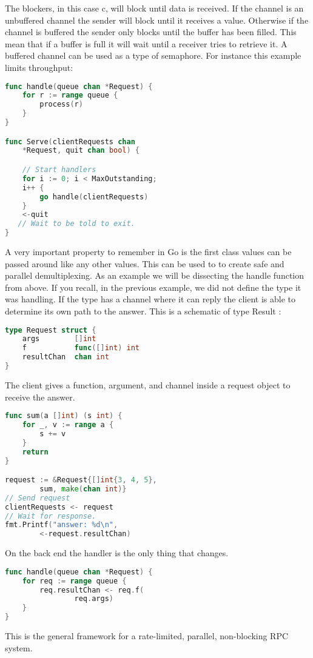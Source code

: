 The blockers, in this case c, will block until data is received. If the channel is an unbuffered channel the sender will block until it receives a value. Otherwise if the channel is buffered the sender only blocks until the buffer has been filled. This mean that if a buffer is full it will wait until a receiver tries to retrieve it. 
	A buffered channel can be used as a type of semaphore. For instance this example limits throughput:
\begin{lstlisting}[language=Go]
func handle(queue chan *Request) {
    for r := range queue {
        process(r)
    }
}

func Serve(clientRequests chan 
	*Request, quit chan bool) {

    // Start handlers
    for i := 0; i < MaxOutstanding;
    i++ {
        go handle(clientRequests)
    }
    <-quit 
   // Wait to be told to exit.
} 
\end{lstlisting}

A very important property to remember in Go is the first class values can be passed around like any other values. This can be used to to create safe and parallel demultiplexing. As an example we will be dissecting the handle function from above. If you recall, in the previous example, we did not define the type it was handling. If the type has a channel where it can reply the client is able to determine its own path to the answer. This is a schematic of type Result :
\begin{lstlisting}[language=Go]
type Request struct {
    args        []int
    f           func([]int) int
    resultChan  chan int
} 
\end{lstlisting}
The client gives a function, argument, and channel inside a request object to receive the answer.
\begin{lstlisting}[language=Go]
func sum(a []int) (s int) {
    for _, v := range a {
        s += v
    }
    return
}

request := &Request{[]int{3, 4, 5}, 
	 	sum, make(chan int)}
// Send request
clientRequests <- request
// Wait for response.
fmt.Printf("answer: %d\n",
		<-request.resultChan)
\end{lstlisting}
On the back end the handler is the only thing that changes. 
\begin{lstlisting}[language=Go]
func handle(queue chan *Request) {
    for req := range queue {
        req.resultChan <- req.f(
			    req.args)
    }
} 
\end{lstlisting}
This is the general framework for a rate-limited, parallel, non-blocking RPC system.
